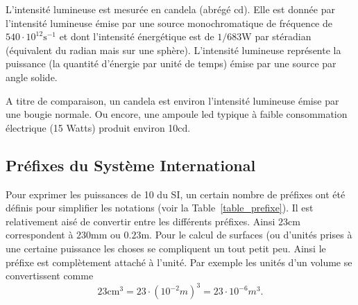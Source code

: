 \documentclass[a4paper,12pt]{book}
\newcommand{\cm}{\mathrm{cm}}
\newcommand{\mm}{\mathrm{mm}}
\newcommand{\cd}{\mathrm{cd}}
\newcommand{\m}{\mathrm{m}}
\newcommand{\s}{\mathrm{s}}
\newcommand{\W}{\mathrm{W}}
\begin{document}
L'intensité lumineuse est mesurée en candela (abrégé $\cd$). Elle est donnée par l'intensité lumineuse émise par
une source monochromatique de fréquence de $540\cdot 10^{12}\s^{-1}$ et dont l'intensité énergétique est de 
$1/683 \W$ par stéradian (équivalent du radian mais sur une sphère). L'intensité lumineuse représente la puissance (la quantité d'énergie 
par unité de temps) émise par une source par angle solide. 

A titre de comparaison, un candela est environ l'intensité 
lumineuse émise par une bougie normale. Ou encore, une ampoule led typique 
à faible consommation électrique (15 Watts) produit environ 10$\cd$.

\subsection{Préfixes du Système International}

Pour exprimer les puissances de 10 du SI, un certain nombre de préfixes ont été définis pour simplifier 
les notations (voir la Table~\ref{table_prefixe}). Il est relativement aisé de convertir entre les différents préfixes.
Ainsi $23\cm$ correspondent à $230\mm$ ou $0.23\m$. Pour le calcul de surfaces (ou d'unités prises à une certaine puissance les choses
se compliquent un tout petit peu. Ainsi le préfixe est complètement attaché à l'unité. Par exemple les unités d'un volume
se convertissent comme
\begin{equation}
 23\cm^3=23\cdot(10^{-2} m)^3=23\cdot 10^{-6}m^3.
\end{equation}
\end{document}
